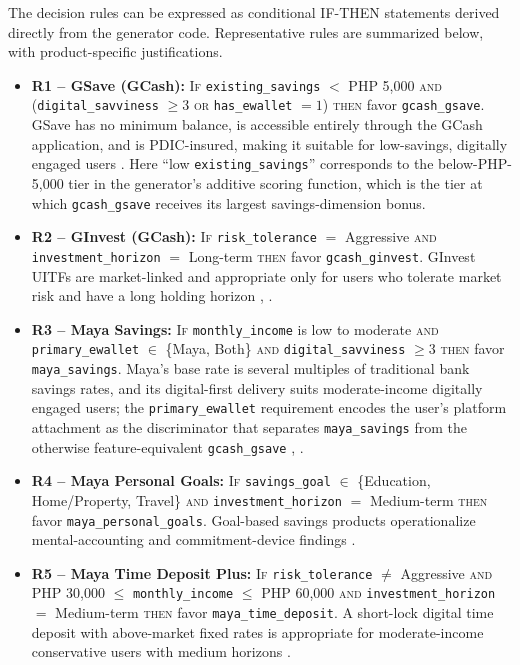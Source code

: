 \documentclass[journal]{./IEEE/IEEEtran}
\begin{document}
The decision rules can be expressed as conditional IF-THEN statements derived directly from the generator code. Representative rules are summarized below, with product-specific justifications.
\begin{itemize}
    \item \textbf{R1 -- GSave (GCash):} \textsc{If} \texttt{existing\_savings} $<$ PHP 5{,}000 \textsc{and} (\texttt{digital\_savviness} $\geq 3$ \textsc{or} \texttt{has\_ewallet} $= 1$) \textsc{then} favor \texttt{gcash\_gsave}. GSave has no minimum balance, is accessible entirely through the GCash application, and is PDIC-insured, making it suitable for low-savings, digitally engaged users \cite{ref35}. Here ``low \texttt{existing\_savings}'' corresponds to the below-PHP-5{,}000 tier in the generator's additive scoring function, which is the tier at which \texttt{gcash\_gsave} receives its largest savings-dimension bonus.
    \item \textbf{R2 -- GInvest (GCash):} \textsc{If} \texttt{risk\_tolerance} $=$ Aggressive \textsc{and} \texttt{investment\_horizon} $=$ Long-term \textsc{then} favor \texttt{gcash\_ginvest}. GInvest UITFs are market-linked and appropriate only for users who tolerate market risk and have a long holding horizon \cite{ref62}, \cite{ref84}.
    \item \textbf{R3 -- Maya Savings:} \textsc{If} \texttt{monthly\_income} is low to moderate \textsc{and} \texttt{primary\_ewallet} $\in$ \{Maya, Both\} \textsc{and} \texttt{digital\_savviness} $\geq 3$ \textsc{then} favor \texttt{maya\_savings}. Maya's base rate is several multiples of traditional bank savings rates, and its digital-first delivery suits moderate-income digitally engaged users; the \texttt{primary\_ewallet} requirement encodes the user's platform attachment as the discriminator that separates \texttt{maya\_savings} from the otherwise feature-equivalent \texttt{gcash\_gsave} \cite{ref9}, \cite{ref35}.
    \item \textbf{R4 -- Maya Personal Goals:} \textsc{If} \texttt{savings\_goal} $\in$ \{Education, Home/Property, Travel\} \textsc{and} \texttt{investment\_horizon} $=$ Medium-term \textsc{then} favor \texttt{maya\_personal\_goals}. Goal-based savings products operationalize mental-accounting and commitment-device findings \cite{ref63}.
    \item \textbf{R5 -- Maya Time Deposit Plus:} \textsc{If} \texttt{risk\_tolerance} $\neq$ Aggressive \textsc{and} PHP 30{,}000 $\leq$ \texttt{monthly\_income} $\leq$ PHP 60{,}000 \textsc{and} \texttt{investment\_horizon} $=$ Medium-term \textsc{then} favor \texttt{maya\_time\_deposit}. A short-lock digital time deposit with above-market fixed rates is appropriate for moderate-income conservative users with medium horizons \cite{ref35}.

\end{itemize}
\end{document}
